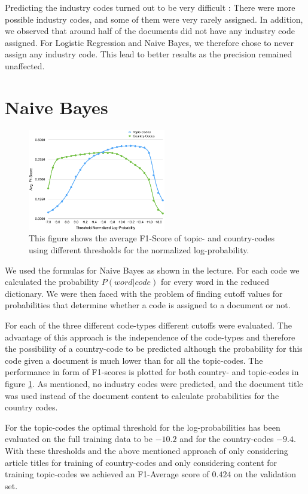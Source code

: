 \documentclass{article}
\begin{document}
Predicting the industry codes turned out to be very difficult : There were more possible industry codes, and some of them were very rarely assigned.  In addition, we observed that around half of the documents did not have any industry code assigned. For Logistic Regression and Naive Bayes, we therefore chose to never assign any industry code. This lead to better results as the precision remained unaffected.

\vspace{-2mm}
\section*{Naive Bayes}

\begin{figure}
    \centering
    \includegraphics[width=6cm]{graphics/BayesF1ScoreTopicCountry.pdf}
    \caption{This figure shows the average F1-Score of topic- and country-codes using different thresholds for the normalized log-probability.}
    \label{fig_bayesThreshold}
\end{figure}

We used the formulas for Naive Bayes as shown in the lecture. For each code we calculated the probability $P(word | code)$ for every word in the reduced dictionary. We were then faced with the problem of finding cutoff values for probabilities that determine whether a code is assigned to a document or not.

For each of the three different code-types different cutoffs were evaluated. The advantage of this approach is the independence of the code-types and therefore the possibility of a country-code to be predicted although the probability for this code given a document is much lower than for all the topic-codes. The performance in form of F1-scores is plotted for both country- and topic-codes in figure \ref{fig_bayesThreshold}. As mentioned, no industry codes were predicted, and the document title was used instead of the document content to calculate probabilities for the country codes.

For the topic-codes the optimal threshold for the log-probabilities has been evaluated on the full training data to be $-10.2$ and for the country-codes $-9.4$. With these thresholds and the above mentioned approach of only considering article titles for training of country-codes and only considering content for training topic-codes we achieved an F1-Average score of $0.424$ on the validation set.
\end{document}
